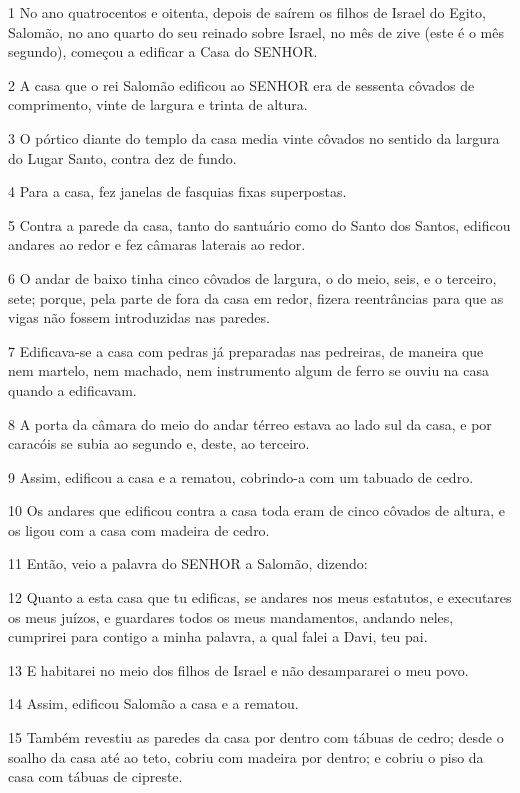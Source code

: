 \par 1 No ano quatrocentos e oitenta, depois de saírem os filhos de Israel do Egito, Salomão, no ano quarto do seu reinado sobre Israel, no mês de zive (este é o mês segundo), começou a edificar a Casa do SENHOR.
\par 2 A casa que o rei Salomão edificou ao SENHOR era de sessenta côvados de comprimento, vinte de largura e trinta de altura.
\par 3 O pórtico diante do templo da casa media vinte côvados no sentido da largura do Lugar Santo, contra dez de fundo.
\par 4 Para a casa, fez janelas de fasquias fixas superpostas.
\par 5 Contra a parede da casa, tanto do santuário como do Santo dos Santos, edificou andares ao redor e fez câmaras laterais ao redor.
\par 6 O andar de baixo tinha cinco côvados de largura, o do meio, seis, e o terceiro, sete; porque, pela parte de fora da casa em redor, fizera reentrâncias para que as vigas não fossem introduzidas nas paredes.
\par 7 Edificava-se a casa com pedras já preparadas nas pedreiras, de maneira que nem martelo, nem machado, nem instrumento algum de ferro se ouviu na casa quando a edificavam.
\par 8 A porta da câmara do meio do andar térreo estava ao lado sul da casa, e por caracóis se subia ao segundo e, deste, ao terceiro.
\par 9 Assim, edificou a casa e a rematou, cobrindo-a com um tabuado de cedro.
\par 10 Os andares que edificou contra a casa toda eram de cinco côvados de altura, e os ligou com a casa com madeira de cedro.
\par 11 Então, veio a palavra do SENHOR a Salomão, dizendo:
\par 12 Quanto a esta casa que tu edificas, se andares nos meus estatutos, e executares os meus juízos, e guardares todos os meus mandamentos, andando neles, cumprirei para contigo a minha palavra, a qual falei a Davi, teu pai.
\par 13 E habitarei no meio dos filhos de Israel e não desampararei o meu povo.
\par 14 Assim, edificou Salomão a casa e a rematou.
\par 15 Também revestiu as paredes da casa por dentro com tábuas de cedro; desde o soalho da casa até ao teto, cobriu com madeira por dentro; e cobriu o piso da casa com tábuas de cipreste.
